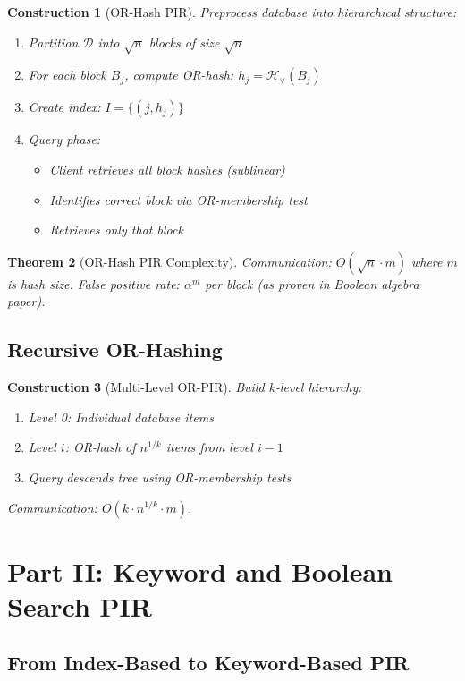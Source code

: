 \documentclass[11pt,final,hidelinks]{article}
\newcommand{\DB}{\mathcal{D}}
\newcommand{\OR}{\lor}
\newcommand{\HashOR}[1]{\mathcal{H}_{\OR}(#1)}
\newtheorem{theorem}{Theorem}[section]
\newtheorem{construction}[theorem]{Construction}
\begin{document}
\begin{construction}[OR-Hash PIR]
Preprocess database into hierarchical structure:
\begin{enumerate}
    \item Partition $\DB$ into $\sqrt{n}$ blocks of size $\sqrt{n}$
    \item For each block $B_j$, compute OR-hash: $h_j = \HashOR{B_j}$
    \item Create index: $I = \{(j, h_j)\}$
    \item Query phase:
    \begin{itemize}
        \item Client retrieves all block hashes (sublinear)
        \item Identifies correct block via OR-membership test
        \item Retrieves only that block
    \end{itemize}
\end{enumerate}
\end{construction}

\begin{theorem}[OR-Hash PIR Complexity]
Communication: $O(\sqrt{n} \cdot m)$ where $m$ is hash size.
False positive rate: $\alpha^m$ per block (as proven in Boolean algebra paper).
\end{theorem}

\subsection{Recursive OR-Hashing}

\begin{construction}[Multi-Level OR-PIR]
Build $k$-level hierarchy:
\begin{enumerate}
    \item Level 0: Individual database items
    \item Level $i$: OR-hash of $n^{1/k}$ items from level $i-1$
    \item Query descends tree using OR-membership tests
\end{enumerate}
Communication: $O(k \cdot n^{1/k} \cdot m)$.
\end{construction}

\section{Part II: Keyword and Boolean Search PIR}

\subsection{From Index-Based to Keyword-Based PIR}
\end{document}

